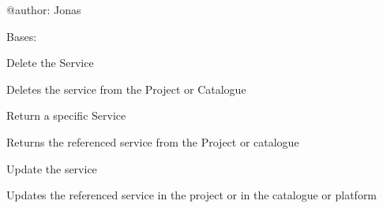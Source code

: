 \documentclass[letterpaper,10pt,english]{sphinxmanual}
\begin{document}
@author: Jonas

\begin{fulllineitems}
\label{_source/son_editor.apis:son_editor.apis.catalogue_servicesapi.Service}
Bases: 

\begin{fulllineitems}
\label{_source/son_editor.apis:son_editor.apis.catalogue_servicesapi.Service.delete}
Delete the Service

Deletes the service from the Project or Catalogue

\end{fulllineitems}


\begin{fulllineitems}
\label{_source/son_editor.apis:son_editor.apis.catalogue_servicesapi.Service.get}
Return a specific Service

Returns the referenced service from the Project or catalogue

\end{fulllineitems}


\begin{fulllineitems}
\label{_source/son_editor.apis:son_editor.apis.catalogue_servicesapi.Service.methods}
\end{fulllineitems}


\begin{fulllineitems}
\label{_source/son_editor.apis:son_editor.apis.catalogue_servicesapi.Service.put}
Update the service

Updates the referenced service in the project or in the catalogue or platform

\end{fulllineitems}


\end{fulllineitems}
\end{document}
